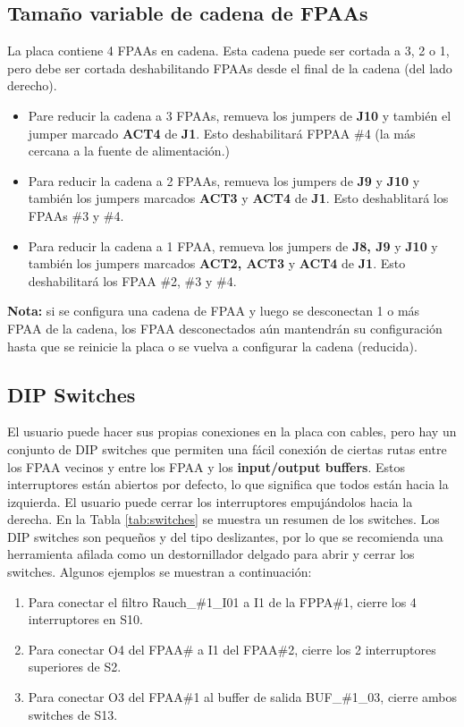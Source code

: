 	\subsection{Tamaño variable de cadena de FPAAs}

	La placa contiene 4 FPAAs en cadena. Esta cadena puede ser cortada a 3, 2 o 1, pero debe ser cortada deshabilitando FPAAs desde el final de la cadena (del lado derecho).

\begin{itemize}
	\item Pare reducir la cadena a 3 FPAAs, remueva los jumpers de \textbf{J10} y también el jumper marcado \textbf{ACT4} de \textbf{J1}. Esto deshabilitará FPPAA \#4 (la más cercana a la fuente de alimentación.)
	\item Para reducir la cadena a 2 FPAAs, remueva los jumpers de \textbf{J9} y \textbf{J10} y también los jumpers marcados \textbf{ACT3} y \textbf{ACT4} de \textbf{J1}. Esto deshablitará los FPAAs \#3 y \#4.
	\item Para reducir la cadena a 1 FPAA, remueva los jumpers de \textbf{J8, J9} y \textbf{J10} y  también los jumpers marcados \textbf{ACT2, ACT3} y \textbf{ACT4} de \textbf{J1}. Esto deshabilitará los FPAA \#2, \#3 y \#4.
\end{itemize}
\textbf{Nota:} si se configura una cadena de FPAA y luego se desconectan 1 o más FPAA de la cadena, los FPAA desconectados aún mantendrán su configuración hasta que se reinicie la placa o se vuelva a configurar la cadena (reducida).

	\subsection{DIP Switches}
	
	El usuario puede hacer sus propias conexiones en la placa con cables, pero hay un conjunto de DIP switches que permiten una fácil conexión de ciertas rutas entre los FPAA vecinos y entre los FPAA y los \textbf{input/output buffers}. Estos interruptores están abiertos por defecto, lo que significa que todos están hacia la izquierda. El usuario puede cerrar los interruptores empujándolos hacia la derecha. En la Tabla \ref{tab:switches} se muestra un resumen de los switches. Los DIP switches son pequeños y del tipo deslizantes, por lo que se recomienda una herramienta afilada como un destornillador delgado para abrir y cerrar los switches. Algunos ejemplos se muestran a continuación:
	
	\begin{enumerate}
		\item Para conectar el filtro Rauch\_\#1\_I01 a I1 de la FPPA\#{}1, cierre los 4 interruptores en S10.
		\item Para conectar O4 del FPAA\#{} a I1 del FPAA\#{}2, cierre los 2 interruptores superiores de S2.
		\item Para conectar O3 del FPAA\#{}1 al buffer de salida BUF\_\#1\_03, cierre ambos switches de S13.
	\end{enumerate}

